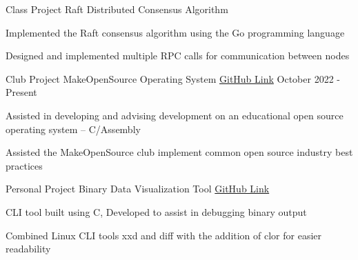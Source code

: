 

\begin{cventries}

  \cventry
    {Class Project} %
    {Raft Distributed Consensus Algorithm} %
    {} %
    {} %
    {
      \begin{cvitems} %
        \item Implemented the Raft consensus algorithm using the Go programming language
	\item Designed and implemented multiple RPC calls for communication between nodes
      \end{cvitems}
    }


  \cventry
    {Club Project} %
    {MakeOpenSource Operating System} %
    {\href{https://github.com/makeopensource/mOS}{GitHub Link}} %
    {October 2022 - Present} %
    {
      \begin{cvitems} %
        \item Assisted in developing and advising development on an educational open source operating system -- C/Assembly
        \item Assisted the MakeOpenSource club implement common open source industry best practices
      \end{cvitems}
    }
  \cventry
    {Personal Project} %
    {Binary Data Visualization Tool} %
    {\href{https://github.com/shawnz99/bdt}{GitHub Link}} %
    {} %
    {
      \begin{cvitems} %
        \item CLI tool built using C, Developed to assist in debugging binary output
        \item Combined Linux CLI tools xxd and diff with the addition of clor for easier readability
      \end{cvitems}
    }



\end{cventries}
